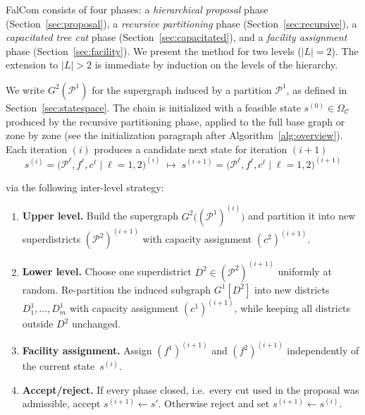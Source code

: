\documentclass[preprint,12pt,authoryear]{elsarticle}
\theoremstyle{definition}
\begin{document}
FalCom consists of four phases: a \emph{hierarchical proposal} phase (Section~\ref{sec:proposal}), a \emph{recursive partitioning} phase (Section~\ref{sec:recursive}), a \emph{capacitated tree cut} phase (Section~\ref{sec:capacitated}), and a \emph{facility assignment} phase (Section~\ref{sec:facility}). We present the method for two levels ($|L| = 2$). The extension to $|L| > 2$ is immediate by induction on the levels of the hierarchy.

We write $G^2(\mathcal{P}^1)$ for the supergraph induced by a partition $\mathcal{P}^1$, as defined in Section~\ref{sec:statespace}. The chain is initialized with a feasible state $s^{(0)} \in \Omega_\mathcal{C}$ produced by the recursive partitioning phase, applied to the full base graph or zone by zone (see the initialization paragraph after Algorithm~\ref{alg:overview}). Each iteration $(i)$ produces a candidate next state for iteration $(i+1)$
%
\[
    s^{(i)} = \bigl(\mathcal{P}^\ell, f^\ell, c^\ell
    \;\big|\; \ell=1,2)^{(i)}
    \;\longmapsto\;
    s^{(i+1)} = \bigl(\mathcal{P}^\ell, f^\ell, c^\ell
    \;\big|\; \ell=1,2)^{(i+1)}
\]
%

%
via the following inter-level strategy:
%
\medskip

\begin{enumerate}[nosep]
    \item \textbf{Upper level.} Build the supergraph
        $G^2\bigl((\mathcal{P}^1)^{(i)}\bigr)$ and partition it into new
        superdistricts $(\mathcal{P}^2)^{(i+1)}$ with capacity assignment
        $(c^2)^{(i+1)}$.
    \item \textbf{Lower level.} Choose one superdistrict
        $D^2 \in (\mathcal{P}^2)^{(i+1)}$ uniformly at random.
        Re-partition the induced subgraph $G^1[D^2]$ into new
        districts $D_1^1, \ldots, D_m^1$ with capacity assignment
        $(c^1)^{(i+1)}$, while keeping all districts outside $D^2$
        unchanged.
    \item \textbf{Facility assignment.} Assign $(f^1)^{(i+1)}$ and
        $(f^2)^{(i+1)}$ independently of the current state~$s^{(i)}$.
        \item \textbf{Accept/reject.} If every phase closed, i.e.\ every cut used in the proposal was admissible, accept $s^{(i+1)} \leftarrow s'$. Otherwise reject and set
        $s^{(i+1)} \leftarrow s^{(i)}$.
\end{enumerate}
\medskip
\end{document}

